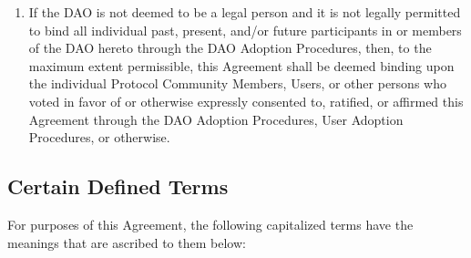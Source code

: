 \documentclass{article}
\begin{document}
\begin{enumerate}
\begin{enumerate}
              \item If the DAO is not deemed to be a legal person and it is not legally permitted to bind all individual past, present, and/or future participants in or members of the DAO hereto through the DAO Adoption Procedures, then, to the maximum extent permissible, this Agreement shall be deemed binding upon the individual Protocol Community Members, Users, or other persons who voted in favor of or otherwise expressly consented to, ratified, or affirmed this Agreement through the DAO Adoption Procedures, User Adoption Procedures, or otherwise.

          \end{enumerate}
\end{enumerate}

\subsection{Certain Defined Terms}\label{subsec:defined_terms_1}

For purposes of this Agreement, the following capitalized terms have the meanings that are ascribed to them below:
\end{document}
